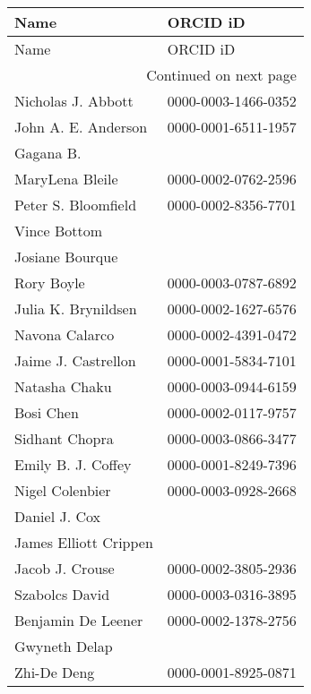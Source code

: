 \begin{longtable}{ll}
\toprule
                      Name &            ORCID iD \\
\midrule
\endfirsthead

\toprule
                      Name &            ORCID iD \\
\midrule
\endhead
\midrule
\multicolumn{2}{r}{{Continued on next page}} \\
\midrule
\endfoot

\bottomrule
\endlastfoot
        Nicholas J. Abbott & 0000-0003-1466-0352 \\
       John A. E. Anderson & 0000-0001-6511-1957 \\
                 Gagana B. &                     \\
           MaryLena Bleile & 0000-0002-0762-2596 \\
       Peter S. Bloomfield & 0000-0002-8356-7701 \\
              Vince Bottom &                     \\
           Josiane Bourque &                     \\
                Rory Boyle & 0000-0003-0787-6892 \\
       Julia K. Brynildsen & 0000-0002-1627-6576 \\
            Navona Calarco & 0000-0002-4391-0472 \\
       Jaime J. Castrellon & 0000-0001-5834-7101 \\
             Natasha Chaku & 0000-0003-0944-6159 \\
                 Bosi Chen & 0000-0002-0117-9757 \\
            Sidhant Chopra & 0000-0003-0866-3477 \\
        Emily B. J. Coffey & 0000-0001-8249-7396 \\
           Nigel Colenbier & 0000-0003-0928-2668 \\
             Daniel J. Cox &                     \\
     James Elliott Crippen &                     \\
           Jacob J. Crouse & 0000-0002-3805-2936 \\
            Szabolcs David & 0000-0003-0316-3895 \\
        Benjamin De Leener & 0000-0002-1378-2756 \\
             Gwyneth Delap &                     \\
               Zhi-De Deng & 0000-0001-8925-0871 \\

\end{longtable}
